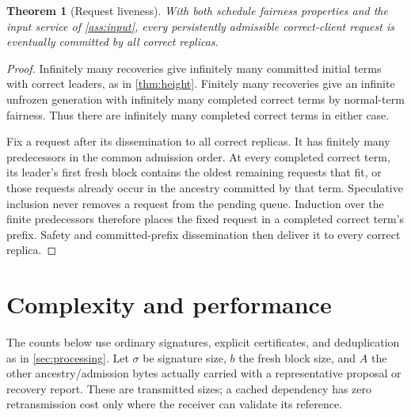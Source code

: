 \documentclass[11pt,a4paper]{article}
\newtheorem{theorem}[theorem]{Theorem}
\begin{document}
\begin{theorem}[Request liveness]
\label{thm:requests}
With both schedule fairness properties and the input service of
\cref{ass:input}, every persistently admissible correct-client request is
eventually committed by all correct replicas.
\end{theorem}
\begin{proof}
Infinitely many recoveries give infinitely many committed initial terms
with correct leaders, as in \cref{thm:height}. Finitely many recoveries give
an infinite unfrozen generation with infinitely many completed correct
terms by normal-term fairness. Thus there are infinitely many completed
correct terms in either case.

Fix a request after its dissemination to all correct replicas. It has
finitely many predecessors in the common admission order. At every
completed correct term, its leader's first fresh block contains the
oldest remaining requests that fit, or those requests already occur in
the ancestry committed by that term. Speculative inclusion never removes
a request from the pending queue. Induction over the finite predecessors
therefore places the fixed request in a completed correct term's prefix.
Safety and committed-prefix dissemination then deliver it to every
correct replica.
\end{proof}

\section{Complexity and performance}
\label{sec:complexity}
The counts below use ordinary signatures, explicit certificates, and
deduplication as in \cref{sec:processing}. Let $\sigma$ be signature size,
$b$ the fresh block size, and $A$ the other ancestry/admission bytes
actually carried with a representative proposal or recovery report.
These are transmitted sizes; a cached dependency has zero retransmission
cost only where the receiver can validate its reference.
\end{document}
